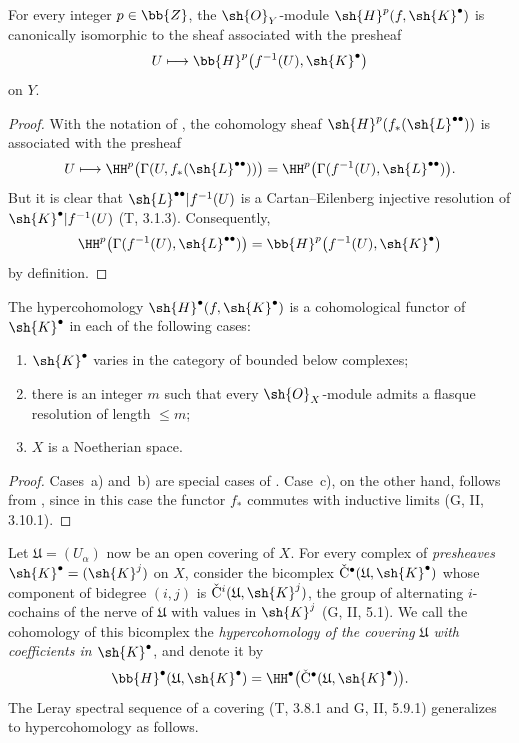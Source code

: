 \begin{proposition}[12.4.3]
\label{0.12.4.3}
For every integer $p\in\bb{Z}$, the $\sh{O}_Y$-module
$\sh{H}^p(f,\sh{K}^\bullet)$ is canonically isomorphic to the sheaf
associated with the presheaf
\[
  U\longmapsto
  \bb{H}^p\bigl(f^{-1}(U),\sh{K}^\bullet\bigr)
\]
on $Y$.
\end{proposition}

\begin{proof}
With the notation of , the cohomology sheaf
$\sh{H}^p(f_*(\sh{L}^{\bullet\bullet}))$ is associated with the
presheaf
\[
  U\longmapsto
  \HH^p\bigl(\Gamma(U,f_*(\sh{L}^{\bullet\bullet}))\bigr)
  =
  \HH^p\bigl(\Gamma(f^{-1}(U),\sh{L}^{\bullet\bullet})\bigr).
\]
But it is clear that
$\sh{L}^{\bullet\bullet}|f^{-1}(U)$ is a Cartan--Eilenberg injective
resolution of $\sh{K}^\bullet|f^{-1}(U)$ (T, 3.1.3).
Consequently,
\[
  \HH^p\bigl(\Gamma(f^{-1}(U),\sh{L}^{\bullet\bullet})\bigr)
  =
  \bb{H}^p\bigl(f^{-1}(U),\sh{K}^\bullet\bigr)
\]
by definition.
\end{proof}

\begin{proposition}[12.4.4]
\label{0.12.4.4}
The hypercohomology $\sh{H}^\bullet(f,\sh{K}^\bullet)$ is a
cohomological functor of $\sh{K}^\bullet$ in each of the following
cases:
\begin{enumerate}
  \item[\rm{a)}] $\sh{K}^\bullet$ varies in the category of bounded
    below complexes;
  \item[\rm{b)}] there is an integer $m$ such that every
    $\sh{O}_X$-module admits a flasque resolution of length $\leq m$;
  \item[\rm{c)}] $X$ is a Noetherian space.
\end{enumerate}
\end{proposition}

\begin{proof}
Cases~a) and~b) are special cases of .
Case~c), on the other hand, follows from , since in
this case the functor $f_*$ commutes with inductive limits
(G, II, 3.10.1).
\end{proof}

\begin{env}[12.4.5]
\label{0.12.4.5}
Let $\mathfrak{U}=(U_\alpha)$ now be an open covering of $X$.
For every complex of \emph{presheaves}
$\sh{K}^\bullet=(\sh{K}^j)$ on $X$, consider the bicomplex
$\check{\mathrm{C}}^\bullet(\mathfrak{U},\sh{K}^\bullet)$ whose
component of bidegree $(i,j)$ is
$\check{\mathrm{C}}^i(\mathfrak{U},\sh{K}^j)$, the group of
alternating $i$-cochains of the nerve of $\mathfrak{U}$ with values
in $\sh{K}^j$ (G, II, 5.1).
We call the cohomology of this bicomplex the
\emph{hypercohomology of the covering $\mathfrak{U}$ with
coefficients in $\sh{K}^\bullet$}, and denote it by
\[
  \bb{H}^\bullet(\mathfrak{U},\sh{K}^\bullet)
  =
  \HH^\bullet
  \bigl(\check{\mathrm{C}}^\bullet
    (\mathfrak{U},\sh{K}^\bullet)\bigr).
\]
The Leray spectral sequence of a covering
(T, 3.8.1 and G, II, 5.9.1) generalizes to hypercohomology as follows.
\end{env}

